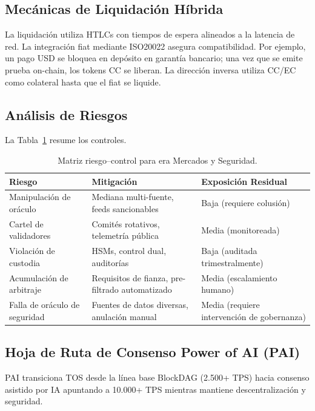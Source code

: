 \documentclass[11pt]{article}
\begin{document}
\subsection{Mecánicas de Liquidación Híbrida}
La liquidación utiliza HTLCs con tiempos de espera alineados a la latencia de red. La integración fiat mediante ISO20022 asegura compatibilidad. Por ejemplo, un pago USD se bloquea en depósito en garantía bancario; una vez que se emite prueba on-chain, los tokens CC se liberan. La dirección inversa utiliza CC/EC como colateral hasta que el fiat se liquide.

\subsection{Análisis de Riesgos}
La Tabla~\ref{tab:risk-markets} resume los controles.

\begin{table}[H]
  \centering
  \begin{tabular}{p{}p{}p{}}
    \toprule
    \textbf{Riesgo} & \textbf{Mitigación} & \textbf{Exposición Residual} \\
    \midrule
    Manipulación de oráculo & Mediana multi-fuente, feeds sancionables & Baja (requiere colusión) \\
    Cartel de validadores & Comités rotativos, telemetría pública & Media (monitoreada) \\
    Violación de custodia & HSMs, control dual, auditorías & Baja (auditada trimestralmente) \\
    Acumulación de arbitraje & Requisitos de fianza, pre-filtrado automatizado & Media (escalamiento humano) \\
    Falla de oráculo de seguridad & Fuentes de datos diversas, anulación manual & Media (requiere intervención de gobernanza) \\
    \bottomrule
  \end{tabular}
  \caption{Matriz riesgo--control para era Mercados y Seguridad.}
  \label{tab:risk-markets}
\end{table}

\subsection{Hoja de Ruta de Consenso Power of AI (PAI)}
\label{sec:pai-roadmap}
PAI transiciona TOS desde la línea base BlockDAG (2.500+ TPS) hacia consenso asistido por IA apuntando a 10.000+ TPS mientras mantiene descentralización y seguridad.
\end{document}
